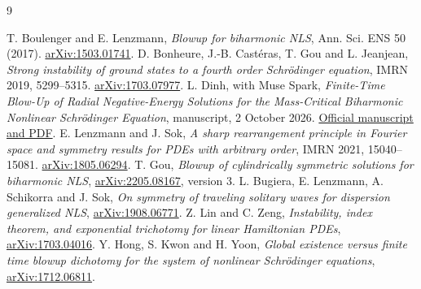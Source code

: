\documentclass[11pt,a4paper]{article}
\theoremstyle{remark}\newtheorem{remark}[theorem]{Remark}
\begin{document}
\appendix



\clearpage
\begin{thebibliography}{9}
\raggedright
{} T. Boulenger and E. Lenzmann,
\emph{Blowup for biharmonic NLS}, Ann. Sci. ENS 50 (2017).
\href{https://arxiv.org/abs/1503.01741}{arXiv:1503.01741}.
 D. Bonheure, J.-B. Cast\'eras, T. Gou and L. Jeanjean,
\emph{Strong instability of ground states to a fourth order Schr\"odinger equation},
IMRN 2019, 5299--5315.
\href{https://arxiv.org/abs/1703.07977}{arXiv:1703.07977}.
 L. Dinh, with Muse Spark,
\emph{Finite-Time Blow-Up of Radial Negative-Energy Solutions for the
Mass-Critical Biharmonic Nonlinear Schr\"odinger Equation}, manuscript,
2 October 2026.
\href{https://ai.meta.com/research/publications/finite-time-blow-up-of-radial-negative-energy-solutions-for-the-mass-critical-biharmonic-nonlinear-schrodinger-equation/}{Official manuscript and PDF}.
 E. Lenzmann and J. Sok,
\emph{A sharp rearrangement principle in Fourier space and symmetry
results for PDEs with arbitrary order}, IMRN 2021, 15040--15081.
\href{https://arxiv.org/abs/1805.06294}{arXiv:1805.06294}.
 T. Gou,
\emph{Blowup of cylindrically symmetric solutions for biharmonic NLS},
\href{https://arxiv.org/abs/2205.08167}{arXiv:2205.08167}, version 3.
 L. Bugiera, E. Lenzmann, A. Schikorra and J. Sok,
\emph{On symmetry of traveling solitary waves for dispersion generalized NLS},
\href{https://arxiv.org/abs/1908.06771}{arXiv:1908.06771}.
 Z. Lin and C. Zeng,
\emph{Instability, index theorem, and exponential trichotomy for linear
Hamiltonian PDEs},
\href{https://arxiv.org/abs/1703.04016}{arXiv:1703.04016}.
 Y. Hong, S. Kwon and H. Yoon,
\emph{Global existence versus finite time blowup dichotomy for the system
of nonlinear Schr\"odinger equations},
\href{https://arxiv.org/abs/1712.06811}{arXiv:1712.06811}.
\end{thebibliography}
\end{document}
